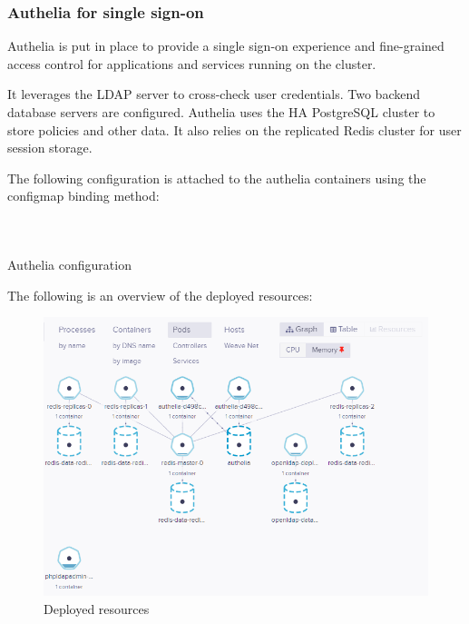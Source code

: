 \subsubsection{Authelia for single sign-on }

Authelia is put in place to provide a single sign-on experience and fine-grained access control for applications and services running on the cluster.  


It leverages the LDAP server to cross-check user credentials. Two backend database servers are configured. Authelia uses the HA PostgreSQL cluster to store policies and other data. It also relies on the replicated Redis cluster for user session storage. 

The following configuration is attached to the authelia containers using the configmap binding method: 

\begin{listing}[H]
    \inputminted[firstline=1,lastline=25]{Yaml}{codeListing/authelia_configmap.yml}
\end{listing}

\begin{listing}[H]
    \inputminted[firstline=26,lastline=55]{Yaml}{codeListing/authelia_configmap.yml}
\end{listing}

\begin{listing}[H]
    \inputminted[firstline=56]{Yaml}{codeListing/authelia_configmap.yml}
    \caption{Authelia configuration}
    \label{lst:Authelia configuration}
\end{listing}


The following is an overview of the deployed resources: 
\begin{figure}[H]\centering
\includegraphics[width=1.0\textwidth,angle=00]{assets/f54.png}
\caption{Deployed resources}
\label{fig:f54}
\end{figure}


